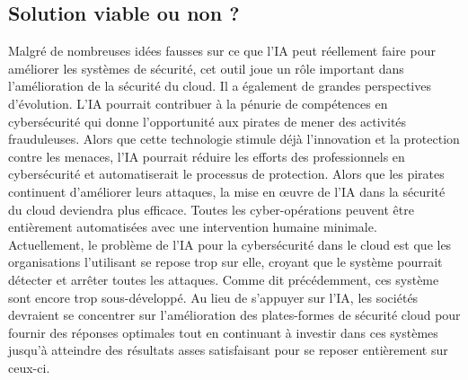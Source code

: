 \documentclass[a4paper, 12pt]{article}
\begin{document}
\begin{spacing}{1.1}
    \subsection{Solution viable ou non ?}
      Malgré de nombreuses idées fausses sur ce que l'IA peut réellement
      faire pour améliorer les systèmes de sécurité, cet outil joue un rôle
      important dans l'amélioration de la sécurité du cloud. Il a également de
      grandes perspectives d’évolution. L’IA pourrait contribuer à la pénurie de
      compétences en cybersécurité qui donne l'opportunité aux pirates de mener
      des activités frauduleuses. Alors que cette technologie stimule déjà
      l'innovation et la protection contre les menaces, l'IA pourrait réduire
      les efforts des professionnels en cybersécurité et automatiserait le
      processus de protection. Alors que les pirates continuent d'améliorer
      leurs attaques, la mise en œuvre de l'IA dans la sécurité du cloud
      deviendra plus efficace. Toutes les cyber-opérations peuvent être
      entièrement automatisées avec une intervention humaine minimale. \\

      Actuellement, le problème de l’IA pour la cybersécurité dans le cloud est
      que les organisations l’utilisant se repose trop sur elle, croyant que le
      système pourrait détecter et arrêter toutes les attaques. Comme dit
      précédemment, ces système sont encore trop sous-développé. Au lieu de
      s'appuyer sur l’IA, les sociétés devraient se concentrer sur
      l'amélioration des plates-formes de sécurité cloud pour fournir des
      réponses optimales tout en continuant à investir dans ces systèmes jusqu’à
      atteindre des résultats asses satisfaisant pour se reposer entièrement sur
      ceux-ci.


\end{spacing}
\end{document}
